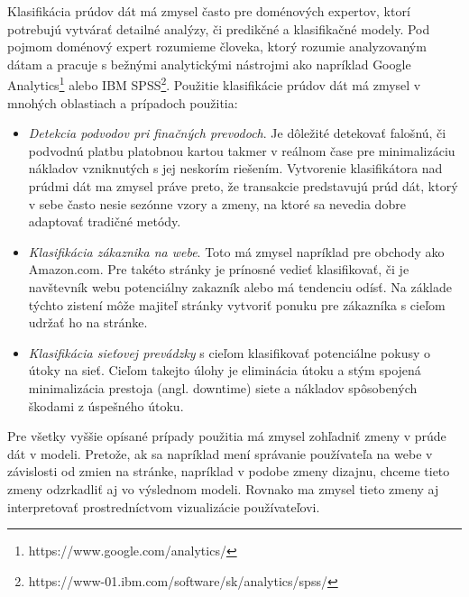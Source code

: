 \par
Klasifikácia prúdov dát má zmysel často pre doménových expertov, ktorí potrebujú vytvárať detailné analýzy, či predikčné a klasifikačné modely. Pod pojmom doménový expert rozumieme človeka, ktorý rozumie analyzovaným dátam a pracuje s bežnými analytickými nástrojmi ako napríklad Google Analytics\footnote{https://www.google.com/analytics/
} alebo IBM SPSS\footnote{https://www-01.ibm.com/software/sk/analytics/spss/}. Použitie klasifikácie prúdov dát má zmysel v mnohých oblastiach a prípadoch použitia:
\begin{itemize}
	\item \textit{Detekcia podvodov pri finačných prevodoch}. Je dôležité detekovať falošnú, či podvodnú platbu platobnou kartou takmer v reálnom čase pre minimalizáciu nákladov vzniknutých s jej neskorím riešením. Vytvorenie klasifikátora nad prúdmi dát ma zmysel práve preto, že transakcie predstavujú prúd dát, ktorý v sebe často nesie sezónne vzory a zmeny, na ktoré sa nevedia dobre adaptovať tradičné metódy.
	\item \textit{Klasifikácia zákaznika na webe}. Toto má zmysel napríklad pre obchody ako Amazon.com. Pre takéto stránky je prínosné vedieť klasifikovať, či je navštevník webu potenciálny zakazník alebo má tendenciu odísť. Na základe týchto zistení môže majiteľ stránky vytvoriť ponuku pre zákazníka s cieľom udržať ho na stránke.
	\item \textit{Klasifikácia sieťovej prevádzky} s cieľom klasifikovať potenciálne pokusy o útoky na sieť. Cieľom takejto úlohy je eliminácia útoku a stým spojená minimalizácia prestoja (angl. downtime) siete a nákladov spôsobených škodami z úspešného útoku.
\end{itemize}
Pre všetky vyššie opísané prípady použitia má zmysel zohľadniť zmeny v prúde dát v modeli. Pretože, ak sa napríklad mení správanie používateľa na webe v závislosti od zmien na stránke, napríklad v podobe zmeny dizajnu, chceme tieto zmeny odzrkadliť aj vo výslednom modeli. Rovnako ma zmysel tieto zmeny aj interpretovať prostredníctvom vizualizácie používateľovi.

